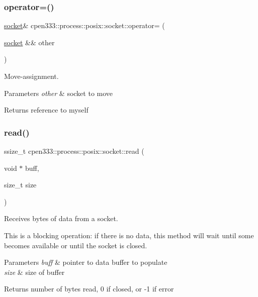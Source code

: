 \subsubsection{\texorpdfstring{operator=()}{operator=()}}
{\footnotesize\ttfamily \hyperlink{classcpen333_1_1process_1_1posix_1_1socket}{socket}\& cpen333\+::process\+::posix\+::socket\+::operator= (\begin{DoxyParamCaption}\item[{\hyperlink{classcpen333_1_1process_1_1posix_1_1socket}{socket} \&\&}]{other }\end{DoxyParamCaption})\hspace{0.3cm}{\ttfamily [inline]}}



Move-\/assignment. 


\begin{DoxyParams}{Parameters}
{\em other} & socket to move \\
\hline
\end{DoxyParams}
\begin{DoxyReturn}{Returns}
reference to myself 
\end{DoxyReturn}
\mbox{\label{classcpen333_1_1process_1_1posix_1_1socket_aaadcd25ad297fc3ca9199f06a5ba7cc8}} 
\subsubsection{\texorpdfstring{read()}{read()}}
{\footnotesize\ttfamily ssize\+\_\+t cpen333\+::process\+::posix\+::socket\+::read (\begin{DoxyParamCaption}\item[{void $\ast$}]{buff,  }\item[{size\+\_\+t}]{size }\end{DoxyParamCaption})\hspace{0.3cm}{\ttfamily [inline]}}



Receives bytes of data from a socket. 

This is a blocking operation\+: if there is no data, this method will wait until some becomes available or until the socket is closed.


\begin{DoxyParams}{Parameters}
{\em buff} & pointer to data buffer to populate \\
\hline
{\em size} & size of buffer \\
\hline
\end{DoxyParams}
\begin{DoxyReturn}{Returns}
number of bytes read, 0 if closed, or -\/1 if error 
\end{DoxyReturn}
\mbox{\label{classcpen333_1_1process_1_1posix_1_1socket_a80d3d77a066ebc082196bb2182021818}} 

